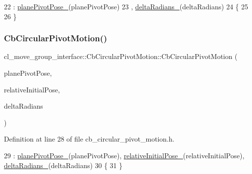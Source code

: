 \begin{DoxyCode}
22             : \hyperlink{classcl__move__group__interface_1_1CbCircularPivotMotion_a0994efbe93b9f9a61fcf3703c360cda2}{planePivotPose\_}(planePivotPose)
23              , \hyperlink{classcl__move__group__interface_1_1CbCircularPivotMotion_afade33f1182615c64ea972075bfd2b95}{deltaRadians\_}(deltaRadians)
24         \{
25 
26         \}
\end{DoxyCode}
\mbox{\label{classcl__move__group__interface_1_1CbCircularPivotMotion_aa92061fd53ae9d7971a6fe4f7b179ba2}} 
\subsubsection{\texorpdfstring{Cb\+Circular\+Pivot\+Motion()}{CbCircularPivotMotion()}\hspace{0.1cm}{\footnotesize\ttfamily [3/3]}}
{\footnotesize\ttfamily cl\+\_\+move\+\_\+group\+\_\+interface\+::\+Cb\+Circular\+Pivot\+Motion\+::\+Cb\+Circular\+Pivot\+Motion (\begin{DoxyParamCaption}\item[{const geometry\+\_\+msgs\+::\+Pose\+Stamped \&}]{plane\+Pivot\+Pose,  }\item[{const geometry\+\_\+msgs\+::\+Pose \&}]{relative\+Initial\+Pose,  }\item[{double}]{delta\+Radians }\end{DoxyParamCaption})\hspace{0.3cm}{\ttfamily [inline]}}



Definition at line 28 of file cb\+\_\+circular\+\_\+pivot\+\_\+motion.\+h.


\begin{DoxyCode}
29             : \hyperlink{classcl__move__group__interface_1_1CbCircularPivotMotion_a0994efbe93b9f9a61fcf3703c360cda2}{planePivotPose\_}(planePivotPose), 
      \hyperlink{classcl__move__group__interface_1_1CbCircularPivotMotion_a1b2cc65d2f27a4dec54c20f1f00d4bb8}{relativeInitialPose\_}(relativeInitialPose), \hyperlink{classcl__move__group__interface_1_1CbCircularPivotMotion_afade33f1182615c64ea972075bfd2b95}{deltaRadians\_}(deltaRadians)
30         \{
31         \}
\end{DoxyCode}


